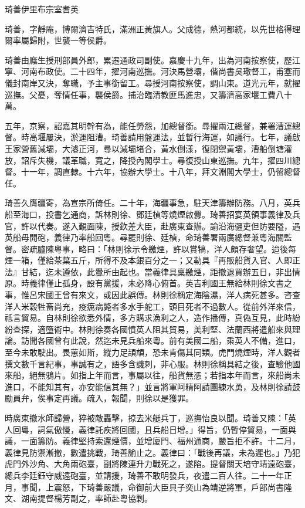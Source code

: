 
\begin{pinyinscope}
琦善伊里布宗室耆英

琦善，字靜庵，博爾濟吉特氏，滿洲正黃旗人。父成德，熱河都統，以先世格得理爾率屬歸附，世襲一等侯爵。

琦善由廕生授刑部員外郎，累遷通政司副使。嘉慶十九年，出為河南按察使，歷江寧、河南布政使。二十四年，擢河南巡撫。河決馬營壩，偕尚書吳璥督工，甫塞而儀封南岸又決，奪職，予主事銜留工。尋授河南按察使，調山東。道光元年，就擢巡撫。父憂，奪情任事，襲侯爵。捕治臨清教匪馬進忠，又籌濟高家堰工費八十萬。

五年，京察，詔嘉其明幹有為，能任勞怨，加總督銜。尋擢兩江總督，兼署漕運總督。時高堰屢決，淤運阻漕。琦善請用盤運法，並暫行海運，如議行。七年，議啟王家營舊減壩，大濬正河，尋以減壩堵合，黃水倒漾，復閉禦黃壩，漕船倒塘灌放，詔斥失機，議革職，寬之，降授內閣學士。尋復授山東巡撫。九年，擢四川總督。十一年，調直隸。十六年，協辦大學士。十八年，拜文淵閣大學士，仍留總督任。

琦善久膺疆寄，為宣宗所倚任。二十年，海疆事急，駐天津籌辦防務。八月，英兵船至海口，投書乞通商，訴林則徐、鄧廷楨等燒煙啟釁。琦善招宴英領事義律及兵官，許以代奏。遂入覲面陳，授欽差大臣，赴廣東查辦。諭沿海疆吏但防要隘，遇英船毋開砲，義律乃率船回粵。尋罷則徐、廷楨，命琦善署兩廣總督兼粵海關監督。密疏臚陳粵事，略曰：「林則徐示令繳煙，許以賞犒，洋人頗存奢望。迨後每煙一箱，僅給茶葉五斤，所得不及本銀百分之一；又勒具『再販船貨入官、人即正法』甘結，迄未遵依，此釁所由起也。當義律具稟繳煙，距撤退買辦五日，非出情原。時義律僅止孤身，設有黨援，未必降心俯首。英吉利國王無給林則徐文書之事，惟呂宋國王曾有來文，或因此誤傳。林則徐稱定海陰濕，洋人病死甚多。咨查洋人米穀牲畜尚充，疫癘病斃者多水手舵工，頭目死者不過數人。從前外洋來信，祗言貿易。自林則徐欲悉外情，多方購求漁利之人，造作播傳，真偽互見，此時紛紛查探，適墮術中。林則徐奏各國憤英人阻其貿易，美利堅、法蘭西將遣船來與理論。訪聞各國曾有此說，然迄未見兵船來粵。前有美國二船，乘英人不備，進口，至今未敢駛出。畏葸如斯，縱力足頡頏，恐未肯傷其同類。虎門燒煙時，洋人觀者撰文數千言紀事，事誠有之，語多含譏刺，非心服。林則徐稱具結之後，查驗他國來船，絕無鴉片。如指上年而言，事屬以往，船貨無憑；若指本年而言，來船尚未進口，不能知其有，亦安能信其無？」並言將軍阿精阿請團練水勇，及林則徐請鼓勵員弁，俟事定再議。疏入，報聞，則徐以是獲罪。

時廣東撤水師歸營，猝被敵轟擊，掠去米艇兵丁，巡撫怡良以聞。琦善又陳：「英人回粵，詞氣傲慢，義律託疾將回國，且兵船日增。」得旨，仍暫停貿易，一面與議，一面籌防。義律堅持索還煙價，並增廈門、福州通商，嚴旨拒不許。十二月，義律見防禦漸撤，數遣挑戰，琦善諭止之。義律曰：「戰後再議，未為遲也。」乃犯虎門外沙角、大角兩砲臺，副將陳連升力戰死之，遂陷。提督關天培守靖遠砲臺，總兵李廷鈺守威遠砲臺，並請援，琦善不敢明發兵，夜遣二百人往。二十一年正月，事聞，上震怒，下琦善嚴議，命御前大臣貝子奕山為靖逆將軍，戶部尚書隆文、湖南提督楊芳副之，率師赴粵協剿。


\end{pinyinscope}
